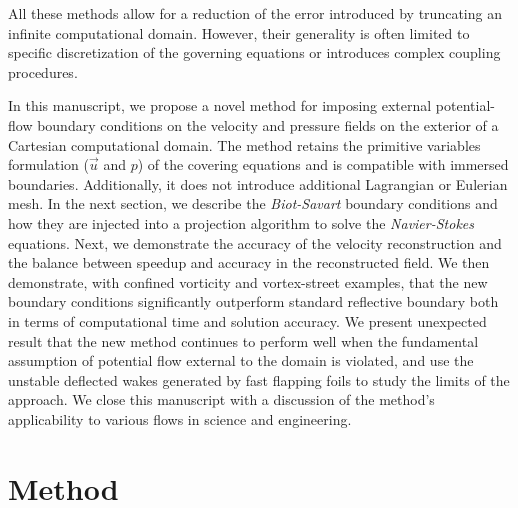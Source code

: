 \documentclass[preprint,12pt]{elsarticle}
\begin{document}
All these methods allow for a reduction of the error introduced by truncating an infinite computational domain. However, their generality is often limited to specific discretization of the governing equations or introduces complex coupling procedures.
 
In this manuscript, we propose a novel method for imposing external potential-flow boundary conditions on the velocity and pressure fields on the exterior of a Cartesian computational domain. The method retains the primitive variables formulation ($\vec u$ and $p$) of the covering equations and is compatible with immersed boundaries. Additionally, it does not introduce additional Lagrangian or Eulerian mesh. In the next section, we describe the \emph{Biot-Savart} boundary conditions and how they are injected into a projection algorithm to solve the \emph{Navier-Stokes} equations. Next, we demonstrate the accuracy of the velocity reconstruction and the balance between speedup and accuracy in the reconstructed field. We then demonstrate, with confined vorticity and vortex-street examples, that the new boundary conditions significantly outperform standard reflective boundary both in terms of computational time and solution accuracy. We present unexpected result that the new method continues to perform well when the fundamental assumption of potential flow external to the domain is violated, and use the unstable deflected wakes generated by fast flapping foils to study the limits of the approach. We close this manuscript with a discussion of the method's applicability to various flows in science and engineering.


\section{Method}
\end{document}
